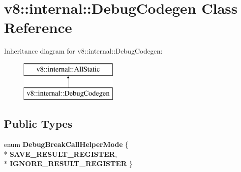 \hypertarget{classv8_1_1internal_1_1_debug_codegen}{}\section{v8\+:\+:internal\+:\+:Debug\+Codegen Class Reference}
\label{classv8_1_1internal_1_1_debug_codegen}
Inheritance diagram for v8\+:\+:internal\+:\+:Debug\+Codegen\+:\begin{figure}[H]
\begin{center}
\leavevmode
\includegraphics[height=2.000000cm]{classv8_1_1internal_1_1_debug_codegen}
\end{center}
\end{figure}
\subsection*{Public Types}
\begin{DoxyCompactItemize}
\item 
enum {\bfseries Debug\+Break\+Call\+Helper\+Mode} \{ \\*
{\bfseries S\+A\+V\+E\+\_\+\+R\+E\+S\+U\+L\+T\+\_\+\+R\+E\+G\+I\+S\+T\+ER}, 
\\*
{\bfseries I\+G\+N\+O\+R\+E\+\_\+\+R\+E\+S\+U\+L\+T\+\_\+\+R\+E\+G\+I\+S\+T\+ER}
 \}\hypertarget{classv8_1_1internal_1_1_debug_codegen_a26f19b53b037a3012fbd58fdc2d9514a}{}\label{classv8_1_1internal_1_1_debug_codegen_a26f19b53b037a3012fbd58fdc2d9514a}

\end{DoxyCompactItemize}
